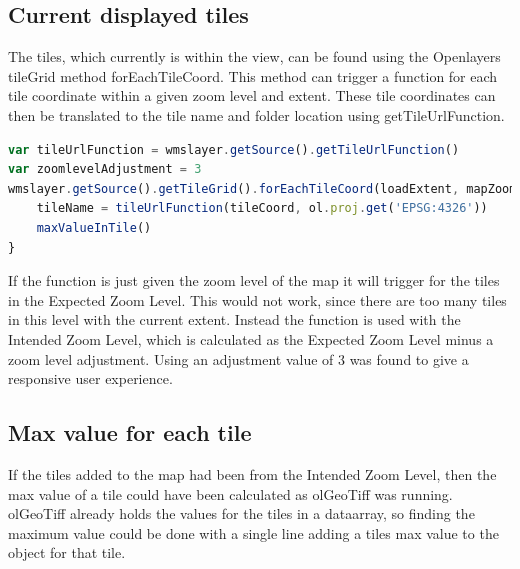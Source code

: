 \subsection{Current displayed tiles}\label{CurrentDisplayedTiles}

The tiles, which currently is within the view, can be found using the Openlayers tileGrid method forEachTileCoord. This method can trigger a function for each tile coordinate within a given zoom level and extent. 
\citep{forEachTileCoord}
These tile coordinates can then be translated to the tile name and folder location using getTileUrlFunction.
\begin{lstlisting}[language=JavaScript, caption={}, label= VoresJS,escapechar=|]
var tileUrlFunction = wmslayer.getSource().getTileUrlFunction()
var zoomlevelAdjustment = 3
wmslayer.getSource().getTileGrid().forEachTileCoord(loadExtent, mapZoom - zoomlevelAdjustment, function(tileCoord) {
	tileName = tileUrlFunction(tileCoord, ol.proj.get('EPSG:4326'))
	maxValueInTile()
}
\end{lstlisting}
If the function is just given the zoom level of the map it will trigger for the tiles in the Expected Zoom Level. This would not work, since there are too many tiles in this level with the current extent. Instead the function is used with the Intended Zoom Level, which is calculated as the Expected Zoom Level minus a zoom level adjustment. Using an adjustment value of 3 was found to give a responsive user experience.


\subsection{Max value for each tile}
If the tiles added to the map had been from the Intended Zoom Level, then the max value of a tile could have been calculated as olGeoTiff was running. olGeoTiff already holds the values for the tiles in a dataarray, so finding the maximum value could be done with a single line adding a tiles max value to the object for that tile. %

